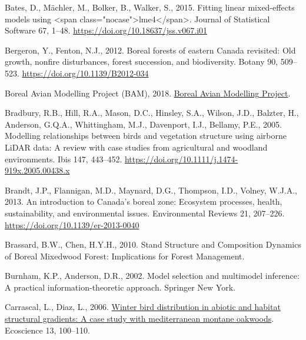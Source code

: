 \documentclass[
]{article}
\newlength{\cslhangindent}
\newlength{\cslentryspacingunit} %
\newenvironment{CSLReferences}[2] %
 {%
  \setlength{\parindent}{0pt}
  \ifodd #1
  \let\oldpar\par
  \def\par{\hangindent=\cslhangindent\oldpar}
  \fi
  \setlength{\parskip}{#2\cslentryspacingunit}
 }%
 {}
\begin{document}
\begin{CSLReferences}{1}{0}
\leavevmode{}%
Bates, D., Mächler, M., Bolker, B., Walker, S., 2015. Fitting linear mixed-effects models using {\textless{}}span class="nocase"{\textgreater{}}lme4{\textless{}}/span{\textgreater{}}. Journal of Statistical Software 67, 1--48. \url{https://doi.org/10.18637/jss.v067.i01}

\leavevmode{}%
Bergeron, Y., Fenton, N.J., 2012. Boreal forests of eastern {Canada} revisited: {Old} growth, nonfire disturbances, forest succession, and biodiversity. Botany 90, 509--523. \url{https://doi.org/10.1139/B2012-034}

\leavevmode{}%
Boreal Avian Modelling Project (BAM), 2018. \href{http://www.borealbirds.ca/}{Boreal {Avian} {Modelling} {Project}}.

\leavevmode{}%
Bradbury, R.B., Hill, R.A., Mason, D.C., Hinsley, S.A., Wilson, J.D., Balzter, H., Anderson, G.Q.A., Whittingham, M.J., Davenport, I.J., Bellamy, P.E., 2005. Modelling relationships between birds and vegetation structure using airborne {LiDAR} data: A review with case studies from agricultural and woodland environments. Ibis 147, 443--452. \url{https://doi.org/10.1111/j.1474-919x.2005.00438.x}

\leavevmode{}%
Brandt, J.P., Flannigan, M.D., Maynard, D.G., Thompson, I.D., Volney, W.J.A., 2013. An introduction to {Canada}'s boreal zone: {Ecosystem} processes, health, sustainability, and environmental issues. Environmental Reviews 21, 207--226. \url{https://doi.org/10.1139/er-2013-0040}

\leavevmode{}%
Brassard, B.W., Chen, H.Y.H., 2010. Stand {Structure} and {Composition} {Dynamics} of {Boreal} {Mixedwood} {Forest}: {Implications} for {Forest} {Management}.

\leavevmode{}%
Burnham, K.P., Anderson, D.R., 2002. Model selection and multimodel inference: {A} practical information-theoretic approach. Springer New York.

\leavevmode{}%
Carrascal, L., Diaz, L., 2006. \href{https://www.tandfonline.com/doi/abs/10.2980/1195-6860(2006)13\%5B100\%3AWBDIAA\%5D2.0.CO\%3B2}{Winter bird distribution in abiotic and habitat structural gradients: A case study with mediterranean montane oakwoods}. Ecoscience 13, 100--110.


\end{CSLReferences}
\end{document}
